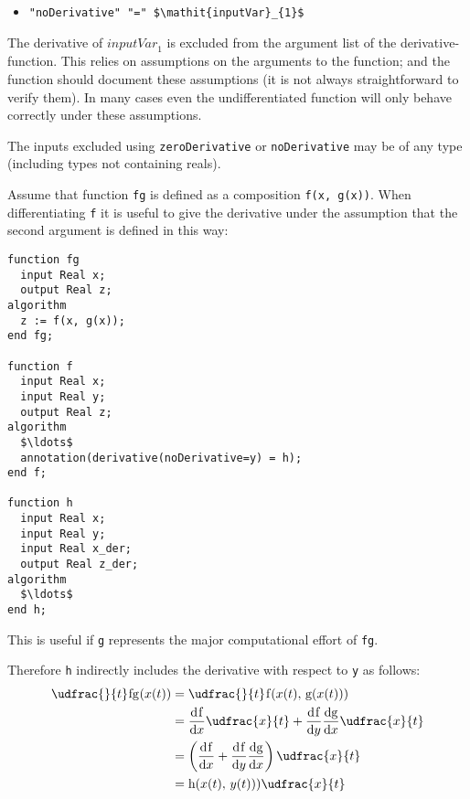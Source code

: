 \begin{itemize}
\item
  {\lstinline[language=grammar]!"noDerivative" "=" $\mathit{inputVar}_{1}$!}
\end{itemize}

The derivative of $\mathit{inputVar}_{1}$ is excluded from the argument list of the derivative-function.
This relies on assumptions on the arguments to the function; and the function should document these assumptions (it is not always straightforward to verify them).
In many cases even the undifferentiated function will only behave correctly under these assumptions.

The inputs excluded using {\lstinline!zeroDerivative!} or {\lstinline!noDerivative!} may be of any type (including types not containing reals).

\begin{nonnormative}
Assume that function {\lstinline!fg!} is defined as a composition {\lstinline!f(x, g(x))!}.
When differentiating {\lstinline!f!} it is useful to give the derivative under the
assumption that the second argument is defined in this way:
\begin{lstlisting}[language=modelica]
function fg
  input Real x;
  output Real z;
algorithm
  z := f(x, g(x));
end fg;

function f
  input Real x;
  input Real y;
  output Real z;
algorithm
  $\ldots$
  annotation(derivative(noDerivative=y) = h);
end f;

function h
  input Real x;
  input Real y;
  input Real x_der;
  output Real z_der;
algorithm
  $\ldots$
end h;
\end{lstlisting}
This is useful if {\lstinline!g!} represents the major computational
effort of {\lstinline!fg!}.

Therefore {\lstinline!h!} indirectly includes the derivative with respect to {\lstinline!y!} as follows:
\begin{equation*}
\begin{aligned}
\udfrac{}{t}\text{{\lstinline!fg!}}(x(t))
&= \udfrac{}{t}\text{{\lstinline!f!}}(x(t),\, \text{{\lstinline!g!}}(x(t)))\\
&= \pdfrac{\text{{\lstinline!f!}}}{x} \udfrac{x}{t} + \pdfrac{\text{{\lstinline!f!}}}{y} \pdfrac{\text{{\lstinline!g!}}}{x} \udfrac{x}{t}\\
&= \left(\pdfrac{\text{{\lstinline!f!}}}{x} + \pdfrac{\text{{\lstinline!f!}}}{y} \pdfrac{\text{{\lstinline!g!}}}{x} \right) \udfrac{x}{t}\\
&= \text{{\lstinline!h!}}(x(t),\, y(t))) \udfrac{x}{t}
\end{aligned}
\end{equation*}
\end{nonnormative}


